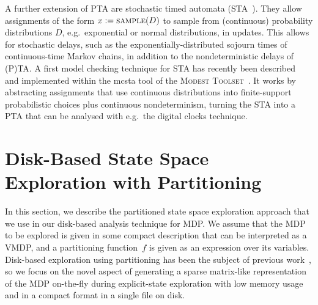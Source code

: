 \documentclass{llncs}
\newcommand{\mcsta}{\textsf{\mbox{mcsta}}\xspace}
\newcommand{\toolset}{\textsc{\mbox{Modest} Toolset}\xspace}
\newcommand{\eg}{e.g.\ }
\begin{document}
A further extension of PTA are stochastic timed automata (STA~\cite{BDHK06}).
They allow assignments of the form $x := \textsc{sample}(D)$ to sample from (continuous) probability distributions $D$, \eg exponential or normal distributions, in updates.
This allows for stochastic delays, such as the exponentially-distributed sojourn times of continuous-time Markov chains, in addition to the nondeterministic delays of (P)TA.
A first model checking technique for STA has recently been described~\cite{HHH14} and implemented within the \mcsta tool of the \toolset~\cite{HH14}.
It works by abstracting assignments that use continuous distributions into finite-support probabilistic choices plus continuous nondeterminism, turning the STA into a PTA that can be analysed with \eg the digital clocks technique.




\section{Disk-Based State Space Exploration with Partitioning}
\label{sec:PartitionedExploration}

In this section, we describe the partitioned state space exploration approach that we use in our disk-based analysis technique for MDP.
We assume that the MDP to be explored is given in some compact description that can be interpreted as a VMDP, and a partitioning function~$f$ is given as an expression over its variables.
Disk-based exploration using partitioning has been the subject of previous work~\cite{BJ05,EK13}, so we focus on the novel aspect of generating a sparse matrix-like representation of the MDP on-the-fly during explicit-state exploration with low memory usage and in a compact format in a single file on disk.
\end{document}
